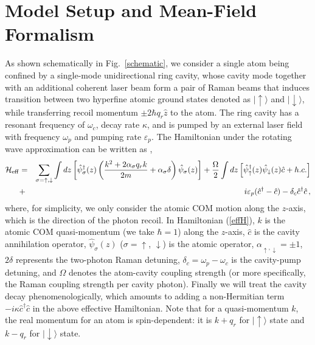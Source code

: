 \documentclass[atoms,article,submit,moreauthors,pdftex,12pt,a4paper]{mdpi}
\def\ba{\begin{eqnarray}}
\def\ea{\end{eqnarray}}
\begin{document}
\section{Model Setup and Mean-Field Formalism} \label{meanfield}

As shown schematically in Fig.~\ref{schematic}, we consider a single atom being confined by a single-mode unidirectional ring cavity, whose cavity mode together with an additional coherent laser beam form a pair of Raman beams that induces transition between two hyperfine atomic ground states denoted as $|\uparrow\rangle$ and $|\downarrow\rangle$, while transferring recoil momentum $\pm 2\hbar q_r\hat{z}$ to the atom. The ring cavity has a resonant frequency of $\omega_c$, decay rate $\kappa$, and is pumped by an external laser field with frequency $\omega_p$ and pumping rate $\varepsilon_p$. 
The Hamiltonian under the rotating wave approximation can be written as \cite{cavitySOC}, 
\ba
 \mathcal{H}_{\rm eff}& = & \sum_{\sigma=\uparrow,\downarrow} \int d{z}\left[ \hat{\psi}^\dagger_\sigma({z})\left(\frac{ { k}^2+ 2\alpha_\sigma q_r {k}}{2m}+\alpha_\sigma \delta\right)\hat{\psi}_\sigma(z)\right]+  \frac{\Omega}{2}\int d{z}\left[\hat{\psi}_{\uparrow}^{\dagger}({z})\hat{\psi}_{\downarrow}({z}) \hat{c}+ h.c. \right]\nonumber \\
 & + & i\varepsilon_{p}(\hat{c}^{\dagger}-\hat{c})-\delta_c \hat{c}^{\dagger}\hat{c} \,, \label{effH}
 \ea
where, for simplicity, we only consider the atomic COM motion along the $z$-axis, which is the direction of the photon recoil. In Hamiltonian (\ref{effH}), $k$ is the atomic COM quasi-momentum (we take $\hbar =1$) along the $z$-axis, $\hat{c}$ is the cavity annihilation operator, $\hat{\psi}_\sigma(z)$ ($\sigma = \uparrow$, $\downarrow$) is the atomic operator, $\alpha_{\uparrow, \downarrow}=\pm 1$, $2\delta$ represents the two-photon Raman detuning, $\delta_c=\omega_p-\omega_c$ is the cavity-pump detuning, and $\Omega$ denotes the atom-cavity coupling strength (or more specifically, the Raman coupling strength per cavity photon). Finally we will treat the cavity decay phenomenologically, which amounts to adding a non-Hermitian term $-i\kappa \hat{c}^{\dagger}\hat{c}$ in the above effective Hamiltonian. Note that for a quasi-momentum $k$, the real momentum for an atom is spin-dependent: it is $k+q_r$ for $|\uparrow \rangle$ state and $k-q_r$ for $|\downarrow \rangle$ state.
\end{document}
